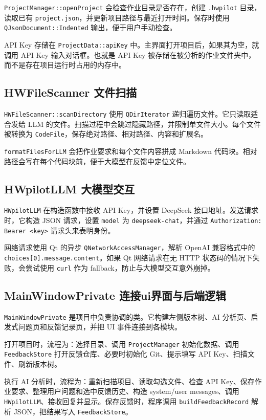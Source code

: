 \documentclass[UTF8,a4paper,11pt,fontset=fandol]{ctexart}
\begin{document}
\texttt{ProjectManager::openProject} 会检查作业目录是否存在，创建 \texttt{.hwpilot} 目录，读取已有 \texttt{project.json}，并更新项目路径与最近打开时间。保存时使用 \texttt{QJsonDocument::Indented} 输出，便于用户手动检查。

API Key 存储在 \texttt{ProjectData::apiKey} 中。主界面打开项目后，如果其为空，就调用 API Key 输入对话框。也就是 API Key 被存储在被分析的作业文件夹中，而不是存在项目运行时占用的内存中。

\subsection{HWFileScanner 文件扫描}

\texttt{HWFileScanner::scanDirectory} 使用 \texttt{QDirIterator} 递归遍历文件。它只读取适合发给 LLM 的文件。扫描过程中会跳过隐藏路径，并限制单文件大小。每个文件被转换为 \texttt{CodeFile}，保存绝对路径、相对路径、内容和扩展名。

\texttt{formatFilesForLLM} 会把作业要求和每个文件内容拼成 Markdown 代码块。相对路径会写在每个代码块前，便于大模型在反馈中定位文件。

\subsection{HWpilotLLM 大模型交互}

\texttt{HWpilotLLM} 在构造函数中接收 API Key，并设置 DeepSeek 接口地址。发送请求时，它构造 JSON 请求，设置 \texttt{model} 为 \texttt{deepseek-chat}，并通过 \texttt{Authorization: Bearer <key>} 请求头来表明身份。

网络请求使用 Qt 的异步 \texttt{QNetworkAccessManager}，解析 OpenAI 兼容格式中的 \texttt{choices[0].message.content}。如果 Qt 网络请求在无 HTTP 状态码的情况下失败，会尝试使用 \texttt{curl} 作为 fallback，防止与大模型交互意外崩掉。

\subsection{MainWindowPrivate 连接ui界面与后端逻辑}

\texttt{MainWindowPrivate} 是项目中负责协调的类。它构建左侧版本树、AI 分析页、启发式问题页和反馈记录页，并把 UI 事件连接到各模块。

打开项目时，流程为：选择目录、调用 \texttt{ProjectManager} 初始化数据、调用 \texttt{FeedbackStore} 打开反馈仓库、必要时初始化 Git、提示填写 API Key、扫描文件、刷新版本树。

执行 AI 分析时，流程为：重新扫描项目、读取勾选文件、检查 API Key、保存作业要求、整理用户问题和选中反馈历史、构造 system/user messages、调用 \texttt{HWpilotLLM}、接收回复并显示。保存反馈时，程序调用 \texttt{buildFeedbackRecord} 解析 JSON，把结果写入 \texttt{FeedbackStore}。
\end{document}
